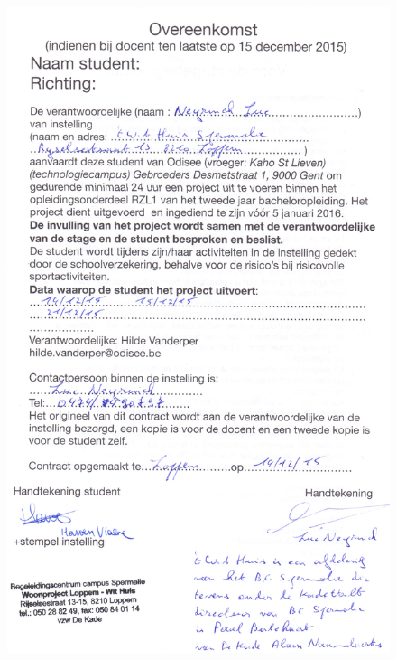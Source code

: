 \documentclass[a4paper,12pt]{article}
\begin{document}
\begin{figure}[H]
  \centering
  \includegraphics[width=\textwidth,height=0.9\textheight,keepaspectratio]{./contract.jpg}
\end{figure}
\end{document}
